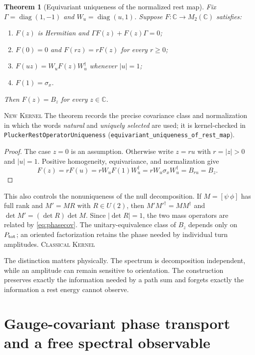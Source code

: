 \documentclass[11pt]{article}
\newcommand{\Kernel}{\textcolor{kernelcolor}{\textsc{Kernel}}}
\newcommand{\Classical}{\textcolor{classicalcolor}{\textsc{Classical}}}
\newcommand{\NewResult}{\textsc{New}}
\newcommand{\diag}{\operatorname{diag}}
\newcommand{\C}{\mathbb{C}}
\newtheorem{theorem}{Theorem}[section]
\begin{document}
\begin{theorem}[Equivariant uniqueness of the normalized rest map]
\label{thm:equivariantuniqueness}
Fix $\Gamma=\diag(1,-1)$ and $W_u=\diag(u,1)$.  Suppose
$F:\C\to M_2(\C)$ satisfies:
\begin{enumerate}[label=(\roman*),leftmargin=2em]
  \item $F(z)$ is Hermitian and $\Gamma F(z)+F(z)\Gamma=0$;
  \item $F(0)=0$ and $F(rz)=rF(z)$ for every $r\geq0$;
  \item $F(uz)=W_uF(z)W_u^\dagger$ whenever $|u|=1$;
  \item $F(1)=\sigma_x$.
\end{enumerate}
Then $F(z)=B_z$ for every $z\in\C$.
\end{theorem}
\noindent\NewResult{} \Kernel{}  The theorem records the precise covariance class and
normalization in which the words \emph{natural} and \emph{uniquely selected}
are used; it is kernel-checked in \texttt{PluckerRestOperatorUniqueness}
(\texttt{equivariant\_uniqueness\_of\_rest\_map}).

\begin{proof}
The case $z=0$ is an assumption.  Otherwise write $z=ru$ with
$r=|z|>0$ and $|u|=1$.  Positive homogeneity, equivariance, and normalization
give
\[
 F(z)=rF(u)=rW_uF(1)W_u^\dagger=rW_u\sigma_xW_u^\dagger=B_{ru}=B_z.
\]
\end{proof}

This also controls the nonuniqueness of the null decomposition.  If
$M=[\psi\ \phi]$ has full rank and $M'=MR$ with $R\in U(2)$, then
$M'M'^\dagger=MM^\dagger$ and
$\det M'=(\det R)\det M$.  Since $|\det R|=1$, the two mass operators are
related by \eqref{eq:phasecov}.  The unitary-equivalence class of $B_z$ depends
only on $P_{\rm tot}$; an oriented factorization retains the phase needed by
individual turn amplitudes.  \Classical{} \Kernel{}

The distinction matters physically.  The spectrum is decomposition
independent, while an amplitude can remain sensitive to orientation.  The
construction preserves exactly the information needed by a path sum and
forgets exactly the information a rest energy cannot observe.

\section{Gauge-covariant phase transport and a free spectral observable}
\label{sec:phasespectrum}
\end{document}
